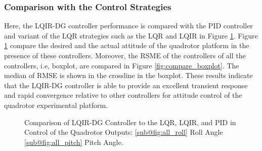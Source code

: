 \documentclass[preprint,12pt,authoryear]{elsarticle}
\begin{document}
\subsubsection{Comparison with the Control Strategies}
\noindent Here, the LQIR-DG controller performance is compared with the PID controller and variant of the LQR strategies such as the LQR and LQIR in Figure \ref{fig:compare}. 
Figure \ref{fig:compare} compare the desired and the actual attitude of the quadrotor platform in the presence of these controllers.
Moreover, the RSME of the controllers of all the controllers, i.e, boxplot, are compared in Figure \ref{fig:compare_boxplot}. %
The median of RMSE is shown in the crossline in the boxplot.
These results indicate that the LQIR-DG controller is able to provide an excellent transient response and rapid convergence relative to other controllers for attitude control of the quadrotor experimental platform.

\begin{figure}[H]
	\centering
	\caption{Comparison of LQIR-DG Controller to the LQR, LQIR, and PID in Control of the Quadrotor Outputs: \ref{sub@fig:all_roll} Roll Angle \ref{sub@fig:all_pitch} Pitch Angle.}
	\label{fig:compare}
\end{figure}
\end{document}
